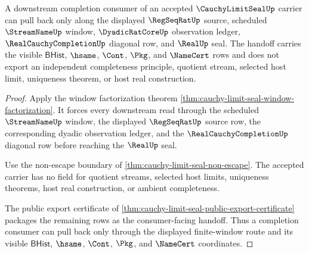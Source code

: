 \begin{theorem}
\label{thm:cauchy-limit-seal-downstream-completion-handoff}
A downstream completion consumer of an accepted $\CauchyLimitSealUp$ carrier can pull back only along the displayed $\RegSeqRatUp$ source, scheduled $\StreamNameUp$ window, $\DyadicRatCoreUp$ observation ledger, $\RealCauchyCompletionUp$ diagonal row, and $\RealUp$ seal. The handoff carries the visible $\mathsf{BHist}$, $\hsame$, $\Cont$, $\Pkg$, and $\NameCert$ rows and does not export an independent completeness principle, quotient stream, selected host limit, uniqueness theorem, or host real construction.
\end{theorem}
\begin{proof}
Apply the window factorization theorem \autoref{thm:cauchy-limit-seal-window-factorization}. It forces every downstream read through the scheduled $\StreamNameUp$ window, the displayed $\RegSeqRatUp$ source row, the corresponding dyadic observation ledger, and the $\RealCauchyCompletionUp$ diagonal row before reaching the $\RealUp$ seal.

Use the non-escape boundary of \autoref{thm:cauchy-limit-seal-non-escape}. The accepted carrier has no field for quotient streams, selected host limits, uniqueness theorems, host real construction, or ambient completeness.

The public export certificate of \autoref{thm:cauchy-limit-seal-public-export-certificate} packages the remaining rows as the consumer-facing handoff. Thus a completion consumer can pull back only through the displayed finite-window route and its visible $\mathsf{BHist}$, $\hsame$, $\Cont$, $\Pkg$, and $\NameCert$ coordinates.
\end{proof}

